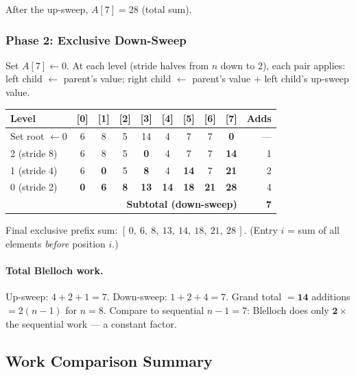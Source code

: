 After the up-sweep, $A[7] = 28$ (total sum). \checkmark

\subsubsection*{Phase 2: Exclusive Down-Sweep}

Set $A[7] \leftarrow 0$. At each level (stride halves from $n$ down to
$2$), each pair applies: left child $\leftarrow$ parent's value;
right child $\leftarrow$ parent's value + left child's up-sweep value.

\begin{center}
\renewcommand{\arraystretch}{1.25}
\begin{tabular}{lccccccccr}
\toprule
\textbf{Level} & [0] & [1] & [2] & [3] & [4] & [5] & [6] & [7]
               & \textbf{Adds} \\
\midrule
Set root $\leftarrow 0$ & 6 & 8 & 5 & 14 & 4 & 7 & 7 & \textbf{0} & --- \\
2 (stride 8)   & 6 & 8 & 5 & \textbf{0} & 4 & 7 & 7 & \textbf{14} & 1 \\
1 (stride 4)   & 6 & \textbf{0} & 5 & \textbf{8} & 4 & \textbf{14} & 7 & \textbf{21} & 2 \\
0 (stride 2)   & \textbf{0} & \textbf{6} & \textbf{8} & \textbf{13} &
                 \textbf{14} & \textbf{18} & \textbf{21} & \textbf{28} & 4 \\
\midrule
\multicolumn{9}{r}{\textbf{Subtotal (down-sweep)}} & \textbf{7} \\
\bottomrule
\end{tabular}
\end{center}

Final exclusive prefix sum:
$[\,0,\ 6,\ 8,\ 13,\ 14,\ 18,\ 21,\ 28\,]$.
(Entry $i$ = sum of all elements \emph{before} position $i$.) \checkmark

\paragraph{Total Blelloch work.}
Up-sweep: $4 + 2 + 1 = 7$.
Down-sweep: $1 + 2 + 4 = 7$.
Grand total $= \mathbf{14}$ additions $= 2(n-1)$ for $n=8$.
Compare to sequential $n-1=7$: Blelloch does only
$\mathbf{2\times}$ the sequential work --- a constant factor.

\subsection{Work Comparison Summary}

